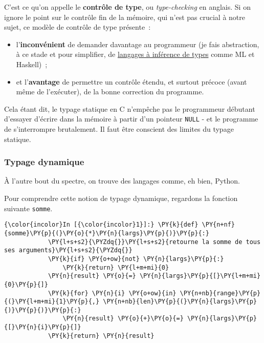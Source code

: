     C'est ce qu'on appelle le \textbf{contrôle de type}, ou
\emph{type-checking} en anglais. Si on ignore le point sur le contrôle
fin de la mémoire, qui n'est pas crucial à notre sujet, ce modèle de
contrôle de type présente~:

\begin{itemize}
\tightlist
\item
  l'\textbf{inconvénient} de demander davantage au programmeur (je fais
  abstraction, à ce stade et pour simplifier, de
  \href{https://en.wikipedia.org/wiki/Type_inference}{langages à
  inférence de types} comme ML et Haskell)~;
\item
  et l'\textbf{avantage} de permettre un contrôle étendu, et surtout
  précoce (avant même de l'exécuter), de la bonne correction du
  programme.
\end{itemize}

    Cela étant dit, le typage statique en C n'empêche pas le programmeur
débutant d'essayer d'écrire dans la mémoire à partir d'un pointeur
\texttt{NULL} - et le programme de s'interrompre brutalement. Il faut
être conscient des limites du typage statique.

    \hypertarget{typage-dynamique}{%
\subsubsection{Typage dynamique}\label{typage-dynamique}}

    À l'autre bout du spectre, on trouve des langages comme, eh bien,
Python.

    Pour comprendre cette notion de typage dynamique, regardons la fonction
suivante \texttt{somme}.

    \begin{Verbatim}[commandchars=\\\{\},frame=single,framerule=0.3mm,rulecolor=\color{cellframecolor}]
{\color{incolor}In [{\color{incolor}1}]:} \PY{k}{def} \PY{n+nf}{somme}\PY{p}{(}\PY{o}{*}\PY{n}{largs}\PY{p}{)}\PY{p}{:}
            \PY{l+s+s2}{\PYZdq{}}\PY{l+s+s2}{retourne la somme de tous ses arguments}\PY{l+s+s2}{\PYZdq{}}
            \PY{k}{if} \PY{o+ow}{not} \PY{n}{largs}\PY{p}{:}
                \PY{k}{return} \PY{l+m+mi}{0}
            \PY{n}{result} \PY{o}{=} \PY{n}{largs}\PY{p}{[}\PY{l+m+mi}{0}\PY{p}{]}
            \PY{k}{for} \PY{n}{i} \PY{o+ow}{in} \PY{n+nb}{range}\PY{p}{(}\PY{l+m+mi}{1}\PY{p}{,} \PY{n+nb}{len}\PY{p}{(}\PY{n}{largs}\PY{p}{)}\PY{p}{)}\PY{p}{:}
                \PY{n}{result} \PY{o}{+}\PY{o}{=} \PY{n}{largs}\PY{p}{[}\PY{n}{i}\PY{p}{]}
            \PY{k}{return} \PY{n}{result}
\end{Verbatim}


